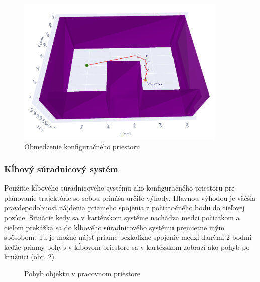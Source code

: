   \begin{figure}[h!]
 	\centering
 	\includegraphics[width=100mm]{img/ObmedzenieCfree.png}
 	\caption{Obmedzenie konfiguračného priestoru} \label{OBRAZOK 4.6} 
 \end{figure}
 
\subsubsection{Kĺbový súradnicový systém}

Použitie kĺbového súradnicového systému ako konfiguračného priestoru pre plánovanie trajektórie so sebou prináša určité výhody. Hlavnou výhodou je väčšia pravdepodobnosť nájdenia priameho spojenia z počiatočného bodu do cieľovej pozície. Situácie kedy sa v kartézskom systéme nachádza medzi počiatkom a cieľom prekážka sa do kĺbového súradnicového systému premietne iným spôsobom. Tu je možné nájsť priame bezkolízne spojenie medzi danými 2 bodmi keďže priamy pohyb v kĺbovom priestore sa v kartézskom zobrazí ako pohyb po kružnici (obr. \ref{OBRAZOK 4.7}). 

 \begin{figure}[h!]
 	\centering
 	\caption{Pohyb objektu v pracovnom priestore} \label{OBRAZOK 4.7} 
 \end{figure} 

